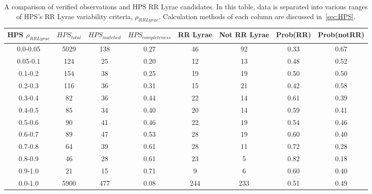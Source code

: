 \documentclass[aps,prb,twocolumn,superscriptaddress]{revtex4-1}
\begin{document}
\begin{table}
	\begin{center}
		\begin{tabular}{|c|c|c|c|c|c|c|c|}\hline
HPS $\rho_{RRLyrae}$ & $HPS_{total}$ & $HPS_{matched}$ & $HPS_{completeness}$ & RR Lyrae & Not RR Lyrae & Prob(RR) & Prob(notRR) \\ \hline
0.0-0.05 & 5029 & 138 	& 0.27 & 46 		& 92 & 0.33 & 0.67 \\ \hline
0.05-0.1 & 124 	& 25 	& 0.20 & 12 		& 13 & 0.48 & 0.52 \\ \hline
0.1-0.2 & 154 	& 38 	& 0.25 & 19 		& 19 & 0.50 & 0.50 \\ \hline
0.2-0.3 & 116 	& 36 	& 0.31 & 15 		& 21 & 0.42 & 0.58 \\ \hline
0.3-0.4 & 82 	& 36 	& 0.44 & 22 		& 14 & 0.61 & 0.39 \\ \hline
0.4-0.5 & 85 	& 34 	& 0.40 & 20		& 14 & 0.59 & 0.41 \\ \hline
0.5-0.6 & 90 	& 41 	& 0.46 & 22		& 19 & 0.54 & 0.46 \\ \hline
0.6-0.7 & 89 	& 47 	& 0.53 & 28		& 19 & 0.60 & 0.40 \\ \hline
0.7-0.8 & 64 	& 39 	& 0.61 & 28 		& 11 & 0.72 & 0.28 \\ \hline
0.8-0.9 & 46 	& 28 	& 0.61& 23 		& 5 & 0.82 & 0.18 \\ \hline
0.9-1.0 & 21 	& 15 	& 0.71 & 9			& 6 & 0.60 & 0.40 \\ \hline
\hline
0.0-1.0 & 5900 & 477 & 0.08 & 244 & 233 & 0.51 & 0.49  \\ \hline
		\end{tabular}
	\end{center}
\caption{ \small{A comparison of verified observations and HPS RR Lyrae candidates. In this table, data is separated into various ranges of HPS's RR Lyrae variability criteria, $\rho_{RRLyrae}$.  Calculation methods of each column are discussed in~\cref{sec:HPS}.\label{tab:HPSlim15}}}
\end{table} 
\end{document}
